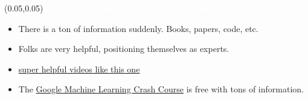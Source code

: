\documentclass[aspectratio=169]{beamer} %
\begin{document}
\begin{frame}{}
    \setlength{\TPHorizModule}{\textwidth}
    \setlength{\TPVertModule}{\textwidth}
    \begin{textblock}{0.74} (0.05,0.05)
        \bfseries\large\textcolor{white}{Amazing Training and Tools Available}
    \end{textblock}

    \begin{itemize}
        \item There is a ton of information suddenly. Books, papers, code, etc.
        \item Folks are very helpful, positioning themselves as experts.
        \item \href{https://youtu.be/8owQBFAHw7E}{super helpful videos like this one}
        \item The \href{https://developers.google.com/machine-learning/crash-course}{Google Machine Learning Crash Course} is free with tons of information.
    \end{itemize}

\end{frame}


\end{document}
